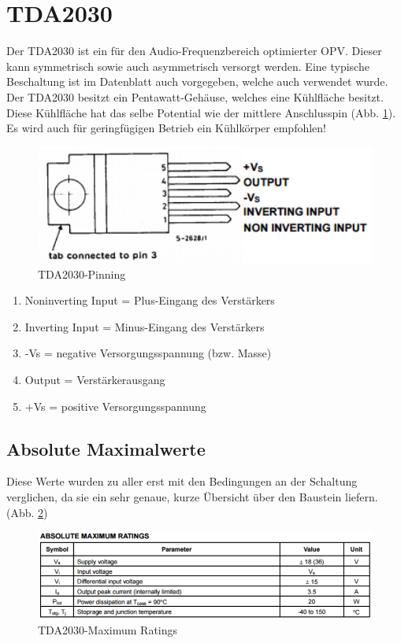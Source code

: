 \section{TDA2030}\label{sec:3.2}
Der TDA2030 ist ein für den Audio-Frequenzbereich optimierter OPV.
Dieser kann symmetrisch sowie auch asymmetrisch versorgt werden.
Eine typische Beschaltung ist im Datenblatt auch vorgegeben, welche auch verwendet wurde.
Der TDA2030 besitzt ein Pentawatt-Gehäuse, welches eine Kühlfläche besitzt.
Diese Kühlfläche hat das selbe Potential wie der mittlere Anschlusspin (Abb. \ref{fig:3.2.1}).\\
Es wird auch für geringfügigen Betrieb ein Kühlkörper empfohlen!
\begin{figure} [H]
	\centering
	\includegraphics[width=1\textwidth]{img/Grundlagen/TDA2030/TDA2030Pinning.PNG}
	\caption[TDA2030-Pinning]{TDA2030-Pinning\footnotemark}
	\label {fig:3.2.1}
\end{figure}
\begin{enumerate}
	\item Noninverting Input = Plus-Eingang des Verstärkers
	\item Inverting Input = Minus-Eingang des Verstärkers
	\item -Vs = negative Versorgungsspannung (bzw. Masse)
	\item Output = Verstärkerausgang
	\item +Vs = positive Versorgungsspannung		
\end{enumerate}


\subsection{Absolute Maximalwerte}\label{subsec:3.2.1}
Diese Werte wurden zu aller erst mit den Bedingungen an der Schaltung verglichen, da sie ein sehr genaue, kurze Übersicht über den Baustein liefern. (Abb. \ref{fig:3.2.1.1})
\begin{figure} [H]
	\centering
	\includegraphics[width=1\textwidth]{img/Grundlagen/TDA2030/TDA2030MaximumRatings.PNG}
	\caption[TDA2030-Maximum Ratings]{TDA2030-Maximum Ratings\footnotemark}
	\label {fig:3.2.1.1}
\end{figure}

